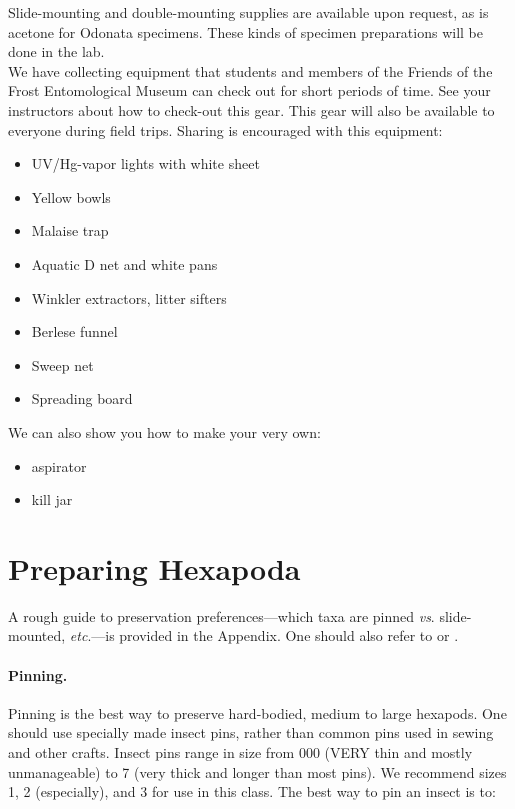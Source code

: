\documentclass[letterpaper, 11pt]{article}
\begin{document}
\noindent{}Slide-mounting and double-mounting supplies are available upon request, as is acetone for Odonata specimens. These kinds of specimen preparations will be done in the lab.\\

\noindent{}We have collecting equipment that students and members of the Friends of the Frost Entomological Museum can check out for short periods of time. See your instructors about how to check-out this gear. This gear will also be available to everyone during field trips. Sharing is encouraged with this equipment:

\begin{itemize}
\item UV/Hg-vapor lights with white sheet
\item Yellow bowls
\item Malaise trap
\item Aquatic D net and white pans
\item Winkler extractors, litter sifters
\item Berlese funnel
\item Sweep net
\item Spreading board
\end{itemize}

We can also show you how to make your very own:
 
\begin{itemize}
\item aspirator
\item kill jar
\end{itemize}

\section*{Preparing Hexapoda}
A rough guide to preservation preferences---which taxa are pinned \textit{vs}. slide-mounted, \textit{etc}.---is provided in the Appendix. One should also refer to \cite{USDAmanual} or \cite{USDAmanual1986}.

\paragraph*{Pinning.} Pinning is the best way to preserve hard-bodied, medium to large hexapods. One should use specially made insect pins, rather than common pins used in sewing and other crafts. Insect pins range in size from 000 (VERY thin and mostly unmanageable) to 7 (very thick and longer than most pins). We recommend sizes 1, 2 (especially), and 3 for use in this class. The best way to pin an insect is to:
 
\end{document}
